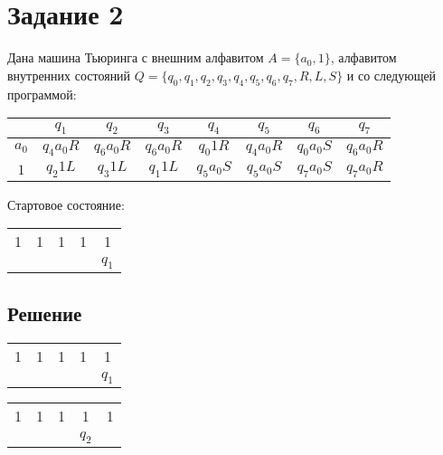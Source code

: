 \documentclass[14pt, a4paper]{article}
\begin{document}
    \vspace{1cm}
    \section*{Задание 2}
    Дана машина Тьюринга с внешним алфавитом $A = \{a_0, 1\}$, алфавитом внутренних состояний $Q = \{q_0, q_1, q_2, q_3, q_4, q_5, q_6, q_7, R, L, S\}$ и со следующей программой:

    \begin{center}
        \begin{tabular}{ | c | c | c | c | c | c | c | c | } 
            \hline
            & $q_1$ & $q_2$ & $q_3$ & $q_4$ & $q_5$ & $q_6$ & $q_7$ \\
            \hline
            $a_0$ & $q_4 a_0 R$ & $q_6 a_0 R$ & $q_6 a_0 R$ & $q_0 1 R$ & $q_4 a_0 R$ & $q_0 a_0 S$ & $q_6 a_0 R$ \\
            \hline
            $1$ & $q_2 1 L$ & $q_3 1 L$ & $q_1 1 L$ & $q_5 a_0 S$ & $q_5 a_0 S$ & $q_7 a_0 S$ & $q_7 a_0 R$ \\
            \hline
        \end{tabular}
    \end{center}
    Стартовое состояние:
    
    \begin{center}
        \begin{tabular}{ | c c c c c | }
            \hline
            1 & 1 & 1 & 1 & 1 \\
            & & & & $q_1$ \\
            \hline
        \end{tabular}
    \end{center}

    \subsection*{Решение}

    \begin{center}
        \begin{tabular}{ | c c c c c | }
            \hline
            1 & 1 & 1 & 1 & 1 \\
            & & & & $q_1$ \\
            \hline
        \end{tabular}
    \end{center}
    
    \begin{center}
        \begin{tabular}{ | c c c c c | }
            \hline
            1 & 1 & 1 & 1 & 1 \\
            & & & $q_2$ & \\
            \hline
        \end{tabular}
    \end{center}
    
\end{document}

